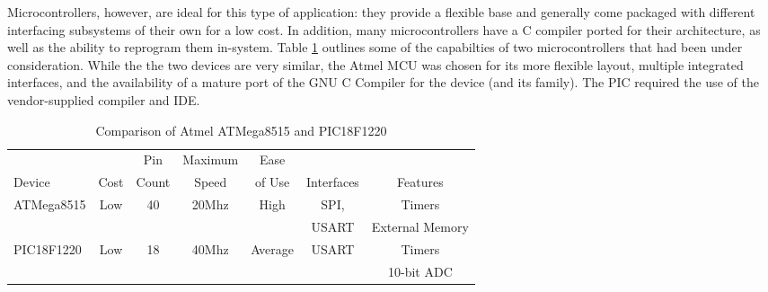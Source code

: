 Microcontrollers, however, are ideal for this type of application: they provide a flexible base and 
generally come packaged with different interfacing subsystems of their own for a low cost. In addition, 
many microcontrollers have a C compiler ported for their architecture, as well as the ability to 
reprogram them in-system. Table \ref{tab:MCU capabilities} outlines some of the capabilties of 
two microcontrollers that had been under consideration. While the the two devices are very similar, 
the Atmel MCU was chosen for its more flexible layout, multiple integrated interfaces, and the 
availability of a mature port of the GNU C Compiler for the device (and its family). The PIC required
the use of the vendor-supplied compiler and IDE.
\begin{table}[bp]
\caption[Atmel and PIC MCUs]{Comparison of Atmel ATMega8515 and PIC18F1220}
\begin{tabular}{l| c c c c c c}

	       &      & Pin  & Maximum& Ease   &            &         \\
	Device & Cost & Count& Speed  & of Use & Interfaces & Features\\\hline
	ATMega8515 & Low & 40 & 20Mhz & High & SPI, & Timers\\
	           &     &    &       &      &USART & External Memory\\\hline
	PIC18F1220 & Low & 18 & 40Mhz & Average & USART & Timers \\
	           &     &    &       &      & & 10-bit ADC\\
\end{tabular}
\label{tab:MCU capabilities}
\end{table}
 
